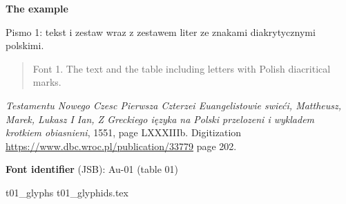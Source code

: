 \documentclass[12pt]{article}
\newcommand{\bg}{\begingl}
\begin{document}
      \bigskip


      \textbf{The example}

      Pismo 1: tekst i zestaw wraz z zestawem liter ze znakami diakrytycznymi polskimi.

      \meskip

      \begin{quote}
        Font 1. The text and the table including letters with Polish diacritical marks.
      \end{quote}
      
  \textit{Testamentu Nowego Czesc Pierwsza Czterzei Euangelistowie
    swieći, Mattheusz, Marek, Lukasz I Ian, Z Greckiego ięzyka na
    Polski przelozeni i wykladem krotkiem obiasnieni}, 1551, page
  LXXXIIIb.  Digitization
  \url{https://www.dbc.wroc.pl/publication/33779} page 202.

  \bigskip
  

    \textbf{Font identifier} (JSB): Au-01 (table 01)
  
 {t01_glyphs}
 {t01_glyphids.tex}


\newpage

    
\end{document}
